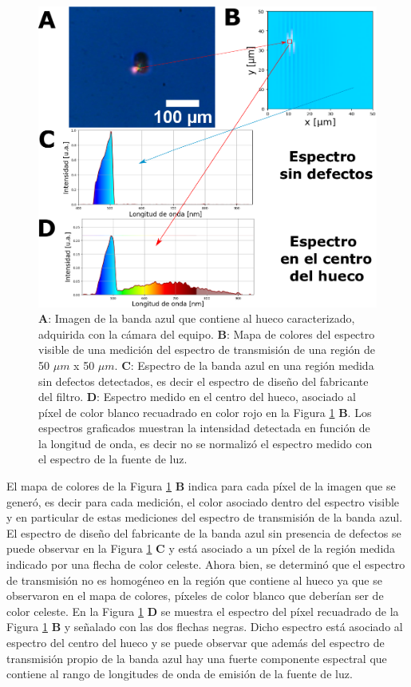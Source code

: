  \begin{figure}[H]
	\centering
	\includegraphics[width=1.0\textwidth]{Figs/microespectrometro/huecocondetalles.png}
	\caption{\textbf{A}: Imagen de la banda azul que contiene al hueco caracterizado, adquirida con la cámara del equipo. \textbf{B}: Mapa de colores del espectro visible de una medición del espectro de transmisión de una región de 50 $\mu m$ x 50 $\mu m$. \textbf{C}: Espectro de la banda azul en una región medida sin defectos detectados, es decir el espectro de diseño del fabricante del filtro. \textbf{D}: Espectro medido en el centro del hueco, asociado al píxel de color blanco recuadrado en color rojo en la Figura \ref{fig:huecoims} \textbf{B}. Los espectros graficados muestran la intensidad detectada en función de la longitud de onda, es decir no se normalizó el espectro medido con el espectro de la fuente de luz.}
	\label{fig:huecoims}
\end{figure}

El mapa de colores de la Figura \ref{fig:huecoims} \textbf{B} indica para cada píxel de la imagen que se generó, es decir para cada medición, el color asociado dentro del espectro visible y en particular de estas mediciones del espectro de transmisión de la banda azul. El espectro de diseño del fabricante de la banda azul sin presencia de defectos se puede observar en la Figura \ref{fig:huecoims} \textbf{C} y está asociado a un píxel de la región medida indicado por una flecha de color celeste. Ahora bien, se determinó que el espectro de transmisión no es homogéneo en la región que contiene al hueco ya que se observaron en el mapa de colores, píxeles de color blanco que deberían ser de color celeste. En la Figura \ref{fig:huecoims} \textbf{D} se muestra el espectro del píxel recuadrado de la Figura \ref{fig:huecoims} \textbf{B} y señalado con las dos flechas negras. Dicho espectro está asociado al espectro del centro del hueco y se puede observar que además del espectro de transmisión  propio de la banda azul hay una fuerte componente espectral que contiene al rango de longitudes de onda de emisión de la fuente de luz.

